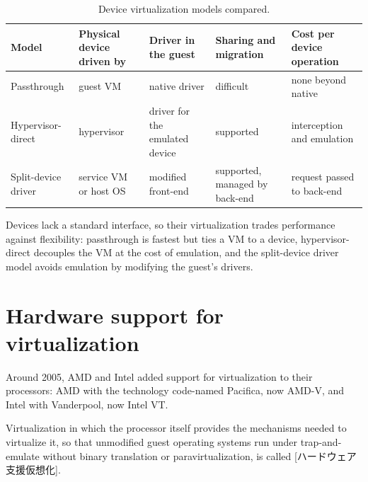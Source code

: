 \documentclass[../main.tex]{subfiles}
\begin{document}
\begin{table}[htbp]
  \centering
  \caption{Device virtualization models compared.}
  \label{tab:l12-devices}
  \small
  \begin{tabular}{@{}>{\raggedright}p{18mm}>{\raggedright}p{20mm}%
      >{\raggedright}p{21.5mm}>{\raggedright}p{20.5mm}%
      >{\raggedright\arraybackslash}p{23mm}@{}}
    \toprule
    Model & Physical device driven by & Driver in the guest & Sharing and
      migration & Cost per device operation \\
    \midrule
    Passthrough & guest VM & native driver & difficult & none beyond native \\
    \addlinespace
    Hypervisor-direct & hypervisor & driver for the emulated device
      & supported & interception and emulation \\
    \addlinespace
    Split-device driver & service VM or host OS & modified front-end
      & supported, managed by back-end & request passed to back-end \\
    \bottomrule
  \end{tabular}
\end{table}

\begin{keypoint}
  Devices lack a standard interface, so their virtualization trades
  performance against flexibility: passthrough is fastest but ties a VM to
  a device, hypervisor-direct decouples the VM at the cost of emulation,
  and the split-device driver model avoids emulation by modifying the
  guest's drivers.
\end{keypoint}

\section{Hardware support for virtualization}
\label{sec:l12-hw}

Around 2005, AMD and Intel added support for virtualization to their
processors: AMD with the technology code-named Pacifica, now AMD-V, and
Intel with Vanderpool, now Intel VT.

\begin{definition}
  Virtualization in which the processor itself provides the mechanisms
  needed to virtualize it, so that unmodified guest operating systems run
  under trap-and-emulate without binary translation or paravirtualization,
  is called [ハードウェア支援仮想化].
\end{definition}
\end{document}
